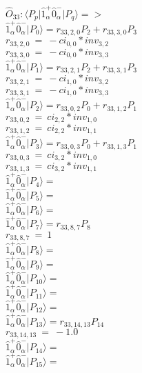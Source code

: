 \documentclass[14pt]{article}
\begin{document}
    $\hat{O}_{33}:  \langle{P_p}\vert \hat{1}_{\alpha}^{+}\hat{0}_{\alpha}^{-} \vert{P_q}\rangle => $ \\ 
    $ \hat{1}_{\alpha}^{+}\hat{0}_{\alpha}^{-} \vert{P_{0}}\rangle = {r}_{33,2,0}P_{2}+{r}_{33,3,0}P_{3} $ \\ 
    ${r}_{33,2,0}\ =\ -{ci}_{0,0}*{inv}_{3,2} $ \\ 
    ${r}_{33,3,0}\ =\ -{ci}_{0,0}*{inv}_{3,3} $ \\ 
    $ \hat{1}_{\alpha}^{+}\hat{0}_{\alpha}^{-} \vert{P_{1}}\rangle = {r}_{33,2,1}P_{2}+{r}_{33,3,1}P_{3} $ \\ 
    ${r}_{33,2,1}\ =\ -{ci}_{1,0}*{inv}_{3,2} $ \\ 
    ${r}_{33,3,1}\ =\ -{ci}_{1,0}*{inv}_{3,3} $ \\ 
    $ \hat{1}_{\alpha}^{+}\hat{0}_{\alpha}^{-} \vert{P_{2}}\rangle = {r}_{33,0,2}P_{0}+{r}_{33,1,2}P_{1} $ \\ 
    ${r}_{33,0,2}\ =\ {ci}_{2,2}*{inv}_{1,0} $ \\ 
    ${r}_{33,1,2}\ =\ {ci}_{2,2}*{inv}_{1,1} $ \\ 
    $ \hat{1}_{\alpha}^{+}\hat{0}_{\alpha}^{-} \vert{P_{3}}\rangle = {r}_{33,0,3}P_{0}+{r}_{33,1,3}P_{1} $ \\ 
    ${r}_{33,0,3}\ =\ {ci}_{3,2}*{inv}_{1,0} $ \\ 
    ${r}_{33,1,3}\ =\ {ci}_{3,2}*{inv}_{1,1} $ \\ 
    $ \hat{1}_{\alpha}^{+}\hat{0}_{\alpha}^{-} \vert{P_{4}}\rangle =  $ \\ 
    $ \hat{1}_{\alpha}^{+}\hat{0}_{\alpha}^{-} \vert{P_{5}}\rangle =  $ \\ 
    $ \hat{1}_{\alpha}^{+}\hat{0}_{\alpha}^{-} \vert{P_{6}}\rangle =  $ \\ 
    $ \hat{1}_{\alpha}^{+}\hat{0}_{\alpha}^{-} \vert{P_{7}}\rangle = {r}_{33,8,7}P_{8} $ \\ 
    ${r}_{33,8,7}\ =\ 1 $ \\ 
    $ \hat{1}_{\alpha}^{+}\hat{0}_{\alpha}^{-} \vert{P_{8}}\rangle =  $ \\ 
    $ \hat{1}_{\alpha}^{+}\hat{0}_{\alpha}^{-} \vert{P_{9}}\rangle =  $ \\ 
    $ \hat{1}_{\alpha}^{+}\hat{0}_{\alpha}^{-} \vert{P_{10}}\rangle =  $ \\ 
    $ \hat{1}_{\alpha}^{+}\hat{0}_{\alpha}^{-} \vert{P_{11}}\rangle =  $ \\ 
    $ \hat{1}_{\alpha}^{+}\hat{0}_{\alpha}^{-} \vert{P_{12}}\rangle =  $ \\ 
    $ \hat{1}_{\alpha}^{+}\hat{0}_{\alpha}^{-} \vert{P_{13}}\rangle = {r}_{33,14,13}P_{14} $ \\ 
    ${r}_{33,14,13}\ =\ -1.0 $ \\ 
    $ \hat{1}_{\alpha}^{+}\hat{0}_{\alpha}^{-} \vert{P_{14}}\rangle =  $ \\ 
    $ \hat{1}_{\alpha}^{+}\hat{0}_{\alpha}^{-} \vert{P_{15}}\rangle =  $ \\ 
    
\end{document}
